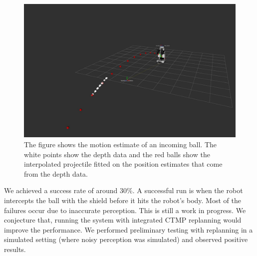 \documentclass[a4paper]{report}
\begin{document}
\begin{figure}[ht]
\centering
 \includegraphics[trim=300 200 300 200, clip, width=0.8\columnwidth]{shield_perception}
\caption{The figure shows the motion estimate of an incoming ball. The white points show the depth data and the red balls show the interpolated projectile fitted on the position estimates that come from the depth data.}
\label{fig:shield_perception}
\end{figure}

We achieved a success rate of around 30\%. A successful run is when the robot intercepts the ball with the shield before it hits the robot's body. Most of the failures occur due to inaccurate perception. This is still a work in progress. We conjecture that, running the system with integrated CTMP replanning would improve the performance. We performed preliminary testing with replanning in a simulated setting (where noisy perception was simulated) and observed positive results. 
\end{document}

